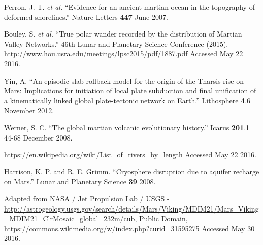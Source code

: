 \documentclass[12pt]{iopart}
\numberwithin{equation}{section}
\begin{document}
\begin{thebibliography}{9}
  Perron, J. T. {\it et al.} ``Evidence for an ancient martian ocean in the topography of deformed shorelines.'' Nature Letters {\bf 447} June 2007.

  Bouley, S. {\it et al.} ``True polar wander recorded by the distribution of Martian Valley Networks.'' 46th Lunar and Planetary Science Conference (2015). \url{http://www.hou.usra.edu/meetings/lpsc2015/pdf/1887.pdf} Accessed May 22 2016.

  Yin, A. ``An episodic slab-rollback model for the origin of the Tharsis rise on Mars: Implications for initiation of local plate subduction and final unification of a kinematically linked global plate-tectonic network on Earth.'' Lithosphere {\bf 4}.6 November 2012.

  Werner, S. C. ``The global martian volcanic evolutionary history.'' Icarus {\bf 201}.1 44-68 December 2008.

  \url{https://en.wikipedia.org/wiki/List_of_rivers_by_length} Accessed May 22 2016.

  Harrison, K. P. and R. E. Grimm. ``Cryosphere disruption due to aquifer recharge on Mars.'' Lunar and Planetary Science {\bf 39} 2008.

  Adapted from NASA / Jet Propulsion Lab / USGS - \url{http://astrogeology.usgs.gov/search/details/Mars/Viking/MDIM21/Mars_Viking_MDIM21_ClrMosaic_global_232m/cub}, Public Domain, \url{https://commons.wikimedia.org/w/index.php?curid=31595275} Accessed May 30 2016.


\end{thebibliography}
\pagebreak
\end{document}
